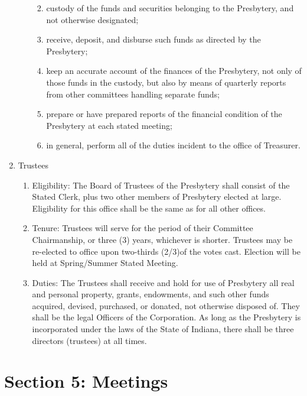 \documentclass[
]{book}
\providecommand{\tightlist}{%
  \setlength{\itemsep}{0pt}\setlength{\parskip}{0pt}}
\begin{document}
\begin{enumerate}
\begin{enumerate}
    \begin{enumerate}
    \def\labelenumiii{\alph{enumiii}.}
    \tightlist
    \item
      custody of the funds and securities belonging to the Presbytery, and not otherwise designated;
    \item
      receive, deposit, and disburse such funds as directed by the Presbytery;
    \item
      keep an accurate account of the finances of the Presbytery, not only of those funds in the custody, but also by means of quarterly reports from other committees handling separate funds;
    \item
      prepare or have prepared reports of the financial condition of the Presbytery at each stated meeting;
    \item
      in general, perform all of the duties incident to the office of Treasurer.
    \end{enumerate}
  \end{enumerate}
\item
  Trustees

  \begin{enumerate}
  \def\labelenumii{\arabic{enumii}.}
  \tightlist
  \item
    Eligibility: The Board of Trustees of the Presbytery shall consist of the Stated Clerk, plus two other members of Presbytery elected at large. Eligibility for this office shall be the same as for all other offices.
  \item
    Tenure: Trustees will serve for the period of their Committee Chairmanship, or three (3) years, whichever is shorter. Trustees may be re-elected to office upon two-thirds (2/3)of the votes cast. Election will be held at Spring/Summer Stated Meeting.
  \item
    Duties: The Trustees shall receive and hold for use of Presbytery all real and personal property, grants, endowments, and such other funds acquired, devised, purchased, or donated, not otherwise disposed of. They shall be the legal Officers of the Corporation. As long as the Presbytery is incorporated under the laws of the State of Indiana, there shall be three directors (trustees) at all times.
  \end{enumerate}
\end{enumerate}

\hypertarget{section-5-meetings}{%
\section*{Section 5: Meetings}\label{section-5-meetings}}
\end{document}
